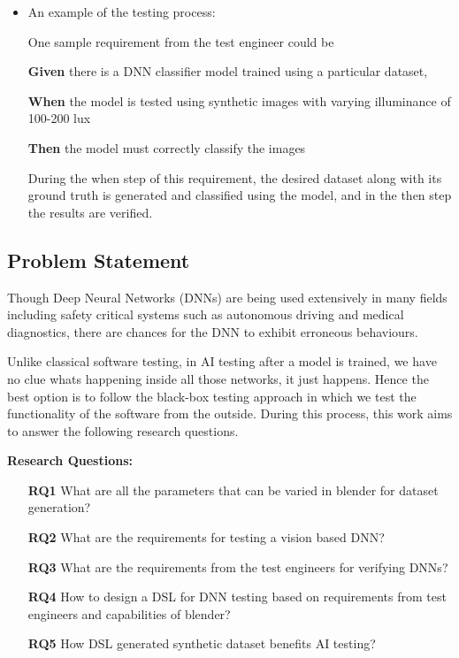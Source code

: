 \documentclass[rnd]{mas_proposal}
\begin{document}
\begin{itemize}
    \item An example of the testing process:
    
    One sample requirement from the test engineer could be
    
    \quad \textbf{Given} there is a DNN classifier model trained using a particular dataset,
    
    \quad \textbf{When} the model is tested using synthetic images with varying illuminance of 100-200 lux
    
    \quad \textbf{Then} the model must correctly classify the images
    
    During the when step of this requirement, the desired dataset along with its ground truth is generated and classified using the model, and in the then step the results are verified.
    
\end{itemize}

\subsection{Problem Statement}

Though Deep Neural Networks (DNNs) are being used extensively in many fields including safety critical systems such as autonomous driving and medical diagnostics, there are chances for the DNN to exhibit erroneous behaviours.

Unlike classical software testing, in AI testing after a model is trained, we have no clue whats happening inside all those networks, it just happens. Hence the best option is to follow the black-box testing approach in which we test the functionality of the software from the outside. During this process, this work aims to answer the following research questions.


    
\textbf{Research Questions:}

\begin{itemize}
    \begin{itemize}
        \item[\textbf{RQ1}] What are all the parameters that can be varied in blender for dataset generation?
        \item[\textbf{RQ2}] What are the requirements for testing a vision based DNN?
        \item[\textbf{RQ3}] What are the requirements from the test engineers for verifying DNNs?
        \item[\textbf{RQ4}] How to design a DSL for DNN testing based on requirements from test engineers and capabilities of blender?
        \item[\textbf{RQ5}] How DSL generated synthetic dataset benefits AI testing?
    \end{itemize}

\end{itemize}
\end{document}
